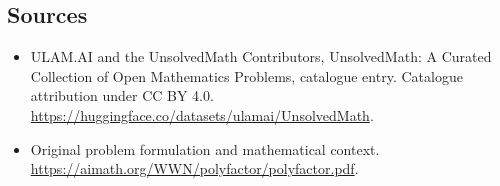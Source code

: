 \documentclass[11pt]{article}
\begin{document}
\subsection{Sources}
\begin{itemize}
\item[\hypertarget{source:statement:1}{S1}] ULAM.AI and the UnsolvedMath Contributors, UnsolvedMath: A Curated Collection of Open Mathematics Problems, catalogue entry. Catalogue attribution under CC BY 4.0.
\url{https://huggingface.co/datasets/ulamai/UnsolvedMath}.
\item[\hypertarget{source:statement:2}{S2}] Original problem formulation and mathematical context.
\url{https://aimath.org/WWN/polyfactor/polyfactor.pdf}.
\end{itemize}
\label{end:statement}
\end{document}
